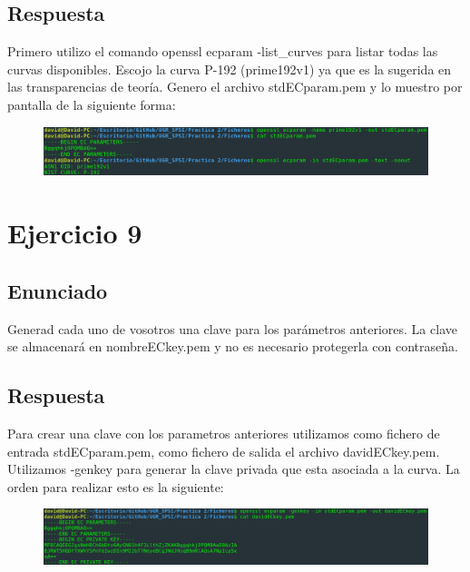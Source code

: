 \documentclass[10pt,a4paper,spanish]{report}
\begin{document}
\section{Respuesta}
\noindent

Primero utilizo el comando openssl ecparam -list\_curves para listar todas las curvas disponibles. Escojo la curva P-192 (prime192v1) ya que es la sugerida en las transparencias de teoría. Genero el archivo stdECparam.pem y lo muestro por pantalla de la siguiente forma:

\begin{figure}[!hbp]
 \centering  \includegraphics[width=1\textwidth]{./Imagenes/8.png}
\end{figure}

\chapter{Ejercicio 9}

\section{Enunciado}
\noindent
Generad cada uno de vosotros una clave para los parámetros anteriores. La clave se almacenará en nombreECkey.pem y no es necesario protegerla con contraseña.

\section{Respuesta}
\noindent
Para crear una clave con los parametros anteriores utilizamos como fichero de entrada stdECparam.pem, como fichero de salida el archivo davidECkey.pem. Utilizamos -genkey para generar la clave privada que esta asociada a la curva. La orden para realizar esto es la siguiente:

\begin{figure}[!hbp]
 \centering  \includegraphics[width=1\textwidth]{./Imagenes/9.png}
\end{figure}
\end{document}
